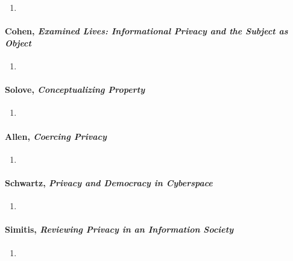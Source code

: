 \begin{enumerate}
    \item %
\end{enumerate}

\paragraph{Cohen, \emph{Examined Lives: Informational Privacy and the Subject 
as Object}}

\begin{enumerate}
    \item %
\end{enumerate}

\paragraph{Solove, \emph{Conceptualizing Property}}

\begin{enumerate}
    \item %
\end{enumerate}

\paragraph{Allen, \emph{Coercing Privacy}}

\begin{enumerate}
    \item %
\end{enumerate}

\paragraph{Schwartz, \emph{Privacy and Democracy in Cyberspace}}

\begin{enumerate}
    \item %
\end{enumerate}

\paragraph{Simitis, \emph{Reviewing Privacy in an Information Society}}

\begin{enumerate}
    \item %
\end{enumerate}

